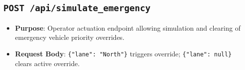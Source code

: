 \subsection{\texttt{POST /api/simulate\_emergency}}
\begin{itemize}[leftmargin=*]
    \item \textbf{Purpose}: Operator actuation endpoint allowing simulation and clearing of emergency vehicle priority overrides.
    \item \textbf{Request Body}: \texttt{\{"lane": "North"\}} triggers override; \texttt{\{"lane": null\}} clears active override.
\end{itemize}
